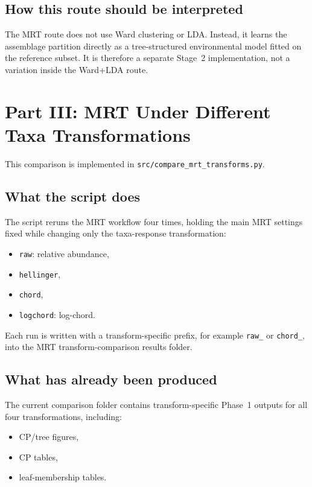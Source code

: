 \documentclass[11pt]{article}
\begin{document}
\subsection{How this route should be interpreted}

The MRT route does not use Ward clustering or LDA. Instead, it learns the assemblage partition directly as a tree-structured environmental model fitted on the reference subset. It is therefore a separate Stage~2 implementation, not a variation inside the Ward+LDA route.

\section{Part III: MRT Under Different Taxa Transformations}

This comparison is implemented in \texttt{src/compare\_mrt\_transforms.py}.

\subsection{What the script does}

The script reruns the MRT workflow four times, holding the main MRT settings fixed while changing only the taxa-response transformation:
\begin{itemize}[leftmargin=*]
  \item \texttt{raw}: relative abundance,
  \item \texttt{hellinger},
  \item \texttt{chord},
  \item \texttt{logchord}: log-chord.
\end{itemize}

Each run is written with a transform-specific prefix, for example
\texttt{raw\_} or \texttt{chord\_}, into the MRT transform-comparison
results folder.

\subsection{What has already been produced}

The current comparison folder contains transform-specific Phase~1 outputs for all four transformations, including:
\begin{itemize}[leftmargin=*]
  \item CP/tree figures,
  \item CP tables,
  \item leaf-membership tables.
\end{itemize}
\end{document}
